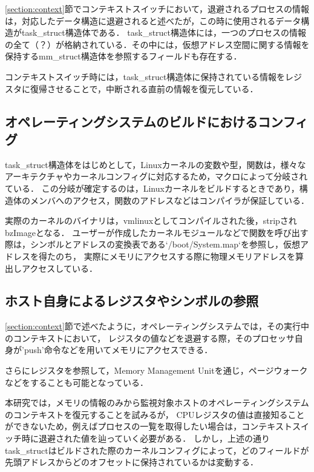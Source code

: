 \ref{section:context}節でコンテキストスイッチにおいて，退避されるプロセスの情報は，対応したデータ構造に退避されると述べたが，この時に使用されるデータ構造がtask\_struct構造体である．
task\_struct構造体には，一つのプロセスの情報の全て（？）が格納されている．その中には，仮想アドレス空間に関する情報を保持するmm\_struct構造体を参照するフィールドも存在する．

コンテキストスイッチ時には，task\_struct構造体に保持されている情報をレジスタに復帰させることで，中断される直前の情報を復元している．

\subsection{オペレーティングシステムのビルドにおけるコンフィグ}

task\_struct構造体をはじめとして，Linuxカーネルの変数や型，関数は，様々なアーキテクチャやカーネルコンフィグに対応するため，マクロによって分岐されている．
この分岐が確定するのは，Linuxカーネルをビルドするときであり，構造体のメンバへのアクセス，関数のアドレスなどはコンパイラが保証している．

実際のカーネルのバイナリは，vmlinuxとしてコンパイルされた後，stripされbzImageとなる．
ユーザーが作成したカーネルモジュールなどで関数を呼び出す際は，シンボルとアドレスの変換表である`/boot/System.map`を参照し，仮想アドレスを得たのち，
実際にメモリにアクセスする際に物理メモリアドレスを算出しアクセスしている．

\subsection{ホスト自身によるレジスタやシンボルの参照}

\ref{section:context}節で述べたように，オペレーティングシステムでは，その実行中のコンテキストにおいて，
レジスタの値などを退避する際，そのプロセッサ自身が'push'命令などを用いてメモリにアクセスできる．

さらにレジスタを参照して，Memory Management Unitを通じ，ページウォークなどをすることも可能となっている．

本研究では，メモリの情報のみから監視対象ホストのオペレーティングシステムのコンテキストを復元することを試みるが，
CPUレジスタの値は直接知ることができないため，例えばプロセスの一覧を取得したい場合は，コンテキストスイッチ時に退避された値を辿っていく必要がある．
しかし，上述の通りtask\_structはビルドされた際のカーネルコンフィグによって，どのフィールドが先頭アドレスからどのオフセットに保持されているかは変動する．

